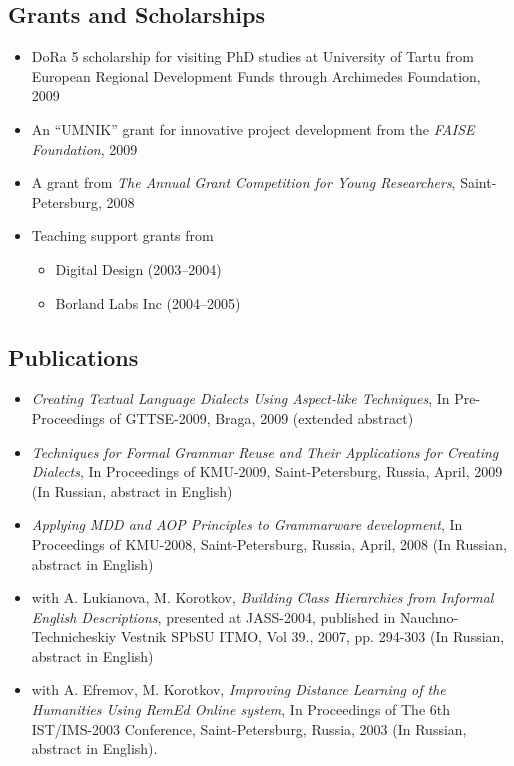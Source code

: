 \documentclass[a4paper, 12pt]{article}
\begin{document}
\subsection*{Grants and Scholarships}
\begin{itemize}
	\item DoRa 5 scholarship for visiting PhD studies at University of Tartu from European Regional Development Funds through Archimedes Foundation, 2009
	\item An ``UMNIK'' grant for innovative project development from the {\it FAISE Foundation}, 2009
	\item A grant from {\it The Annual Grant Competition for Young Researchers}, Saint-Petersburg, 2008
	\item {Teaching support grants from 
		\begin{itemize}
			\item Digital Design (2003--2004)  
			\item Borland Labs Inc (2004--2005) 
		\end{itemize}}
\end{itemize}

\subsection*{Publications}
\begin{itemize}
	\item {\it Creating Textual Language Dialects Using Aspect-like Techniques}, In Pre-Proceedings of GTTSE-2009, Braga, 2009 (extended abstract)
	\item {\it Techniques for Formal Grammar Reuse and Their Applications for Creating Dialects}, In Proceedings of KMU-2009, Saint-Petersburg, Russia, April, 2009 (In Russian, abstract in English)
	\item {\it Applying MDD and AOP Principles to Grammarware development}, In Proceedings of KMU-2008, Saint-Petersburg, Russia, April, 2008 (In Russian, abstract in English)
	\item with A. Lukianova, M. Korotkov, {\it Building Class Hierarchies from Informal English Descriptions}, presented at JASS-2004, published in Nauchno-Technicheskiy Vestnik SPbSU ITMO, Vol 39., 2007, pp. 294-303 (In Russian, abstract in English)
	\item with A. Efremov, M. Korotkov, {\it Improving Distance Learning of the Humanities Using {\it RemEd} Online system}, In Proceedings of The 6th IST/IMS-2003 Conference, Saint-Petersburg, Russia, 2003 (In Russian, abstract in English).
\end{itemize}
\end{document}
